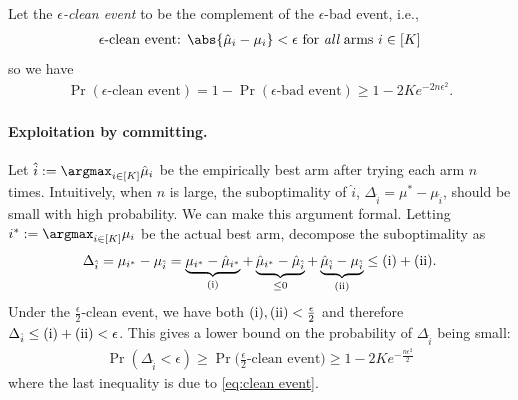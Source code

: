 Let the {\em $\epsilon$-clean event} to be the complement of the $\epsilon$-bad event, i.e.,
\begin{align*}
\text{
$\epsilon$-clean event: $\abs{\hat{\mu}_i-\mu_i} < \epsilon$ for {\em all} arms $i\in[K]$
}
\end{align*}
so we have 
\begin{align}
\label{eq:clean event}
    \Pr(\text{$\epsilon$-clean event})  = 1-\Pr(\text{$\epsilon$-bad event}) \geq 1- 2K e^{-2 n \epsilon^2}.
\end{align}


\paragraph{Exploitation by committing.}
Let $\hat{i}:=\argmax_{i\in[K]} \hat{\mu}_{i}$ be the empirically best arm after trying each arm $n$ times.
Intuitively, when $n$ is large, the suboptimality of $\hat{i}$, $\Delta_{\hat{i}}=\mu^* - \mu_{\hat{i}}$, should be small with high probability.
We can make this argument formal.
Letting $i^*:=\argmax_{i\in[K]} {\mu}_{i}$ be the actual best arm, decompose the suboptimality as 
\begin{align*}
    \Delta_{\hat{i}} = 
\mu_{i^*}-\mu_{\hat{i}} =\underbrace{\mu_{i^*}-\hat{\mu}_{i^*}}_{{\rm (i)}}+\underbrace{\hat{\mu}_{i^*}-\hat{\mu}_{\hat{i}}}_{\leq 0}+\underbrace{\hat{\mu}_{\hat{i}}-\mu_{\hat{i}}}_{\rm (ii)}
\leq {\rm (i)}+{\rm (ii)}
.
\end{align*}
Under the $\frac{\epsilon}{2}$-clean event, we have both ${\rm (i)},{\rm (ii)}<\frac{\epsilon}{2}$ and therefore $\Delta_{\hat{i}}\leq{\rm (i)}+{\rm (ii)}<\epsilon$.
This gives a lower bound on the probability of $\Delta_{\hat{i}}$ being small:
\begin{align}
\label{eq:Delta_hat_i}
    \Pr(\Delta_{\hat{i}}<\epsilon) \geq \Pr\big(\text{$\tfrac{\epsilon}{2}$-clean event}\big) \geq 1 - 2K e^{-\frac{n \epsilon^2}{2}}
\end{align}
where the last inequality is due to \eqref{eq:clean event}.


